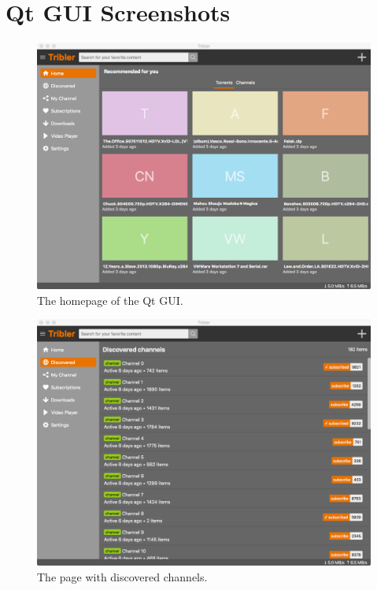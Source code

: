 \chapter{Qt GUI Screenshots}
\label{appendix:qt-gui-screenshots}

\begin{figure}[h!]
	\centering
	\includegraphics[width=0.95\columnwidth]{images/qt_gui/screenshot_homepage}
	\caption{The homepage of the Qt GUI.}
	\label{fig:gui-screenshot-homepage}
\end{figure}

\begin{figure}[h!]
	\centering
	\includegraphics[width=0.95\columnwidth]{images/qt_gui/screenshot_discovered}
	\caption{The page with discovered channels.}
	\label{fig:gui-screenshot-discovered}
\end{figure}

